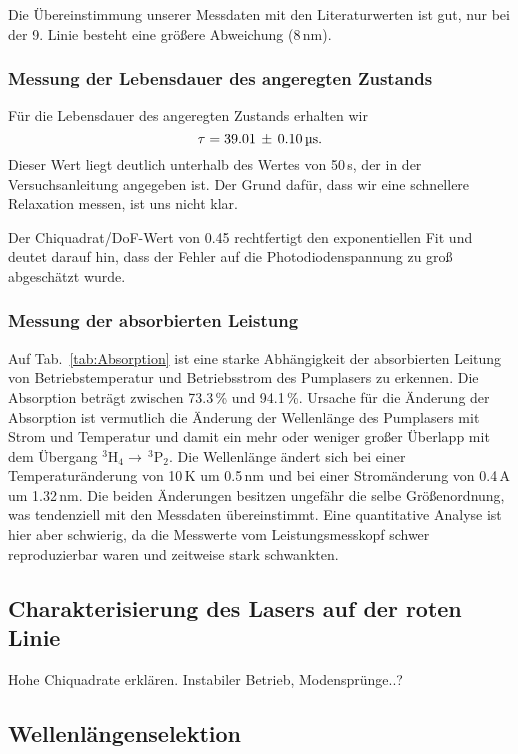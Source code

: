 Die Übereinstimmung unserer Messdaten mit den Literaturwerten ist gut,
nur bei der 9. Linie besteht eine größere Abweichung (8\,nm).



\subsubsection{Messung der Lebensdauer des angeregten Zustands}

Für die Lebensdauer des angeregten Zustands erhalten wir
\begin{equation*}
\tau = 39.01\,\pm\,0.10\,\text{\textmu s}.
\end{equation*}
Dieser Wert liegt deutlich unterhalb des Wertes von 50\,\textmu s,
der in der Versuchsanleitung angegeben ist.
Der Grund dafür, dass wir eine schnellere Relaxation messen, ist uns nicht klar.

Der Chiquadrat/DoF-Wert von 0.45 rechtfertigt den exponentiellen Fit und deutet darauf hin,
dass der Fehler auf die Photodiodenspannung zu groß abgeschätzt wurde.

\subsubsection{Messung der absorbierten Leistung}

Auf Tab.~\ref{tab:Absorption} ist eine starke Abhängigkeit der absorbierten Leitung von
Betriebstemperatur und Betriebsstrom des Pumplasers zu erkennen.
Die Absorption beträgt zwischen 73.3\,\% und 94.1\,\%.
Ursache für die Änderung der Absorption ist vermutlich die Änderung der Wellenlänge des Pumplasers
mit Strom und Temperatur und damit ein mehr oder weniger großer Überlapp mit dem Übergang
$^3$H$_4 \rightarrow\, ^3$P$_2$.
Die Wellenlänge ändert sich bei einer Temperaturänderung von 10\,K um 0.5\,nm und bei einer
Stromänderung von 0.4\,A um 1.32\,nm.
Die beiden Änderungen besitzen ungefähr die selbe Größenordnung,
was tendenziell mit den Messdaten übereinstimmt.
Eine quantitative Analyse ist hier aber schwierig,
da die Messwerte vom Leistungsmesskopf schwer reproduzierbar waren und zeitweise stark schwankten. 


\subsection{Charakterisierung des Lasers auf der roten Linie}
Hohe Chiquadrate erklären. Instabiler Betrieb, Modensprünge..?


\subsection{Wellenlängenselektion}